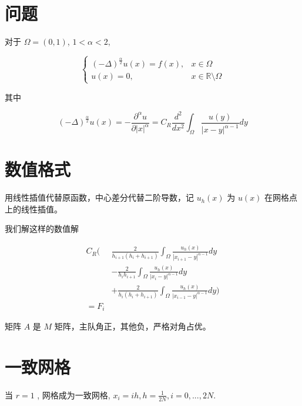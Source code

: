 \documentclass{ctexart}
\begin{document}
\section{问题}

对于 \(\Omega=(0,1)\), \(1<\alpha<2\),

\begin{equation}
    \begin{cases}
        (-\Delta)^{\frac{\alpha}{2}} u(x) = f(x),    & x \in \Omega  \\
        u(x) = 0,   & x \in \mathbb{R} \setminus \Omega
    \end{cases}
\end{equation}

其中

\begin{equation}
    (-\Delta)^{\frac{\alpha}{2}} u(x) = -\frac{\partial^\alpha u}{\partial |x|^\alpha} 
    = C_R \frac{d^2}{dx^2} \int_\Omega \frac{u(y)}{|x-y|^{\alpha-1}} dy
\end{equation}


\section{数值格式}

用线性插值代替原函数，中心差分代替二阶导数，记 \(u_h(x)\) 为 \(u(x)\) 在网格点上的线性插值。

我们解这样的数值解

\begin{equation}
    \begin{aligned}
        C_R ( & \frac{2}{h_{i+1} (h_i + h_{i+1})}\int_\Omega \frac{u_h(x)}{ |x_{i+1}-y|^{\alpha-1} } dy \\
                & -\frac{2}{h_i h_{i+1}}\int_\Omega \frac{u_h(x)}{ |x_i-y|^{\alpha-1} } dy \\
                & + \frac{2}{h_i (h_i+ h_{i+1})}\int_\Omega \frac{u_h(x)}{ |x_{i-1}-y|^{\alpha-1} } dy
            ) \\
        = F_i
    \end{aligned}
\end{equation}


矩阵 \(A\) 是 \(M\) 矩阵，主队角正，其他负，严格对角占优。


\section{一致网格}

当 \(r=1\) , 网格成为一致网格, \(x_i = ih, h=\frac{1}{2N}, i=0, ..., 2N\).
\end{document}
